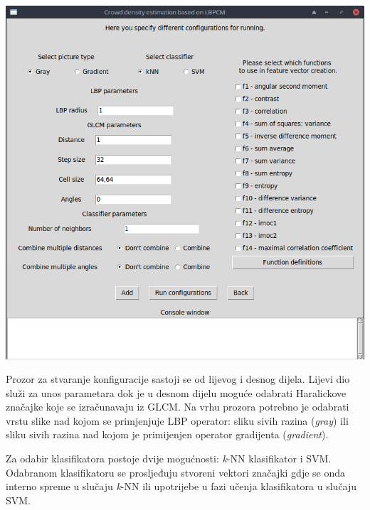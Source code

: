 \documentclass[times, utf8, zavrsni]{fer}
\begin{document}
\begin{minipage}{\linewidth}
\centering
\includegraphics[scale=0.35]{img/fvc2.png}
\end{minipage}

\bigbreak

Prozor za stvaranje konfiguracije sastoji se od lijevog i desnog dijela. 
Lijevi dio služi za unos parametara dok je u desnom dijelu moguće odabrati
Haralickove značajke koje se izračunavaju iz GLCM. Na vrhu prozora potrebno
je odabrati vrstu slike nad kojom se primjenjuje LBP operator: sliku 
sivih razina (\textit{gray}) ili sliku sivih razina nad kojom je 
primijenjen operator gradijenta (\textit{gradient}). 

\bigbreak

Za odabir klasifikatora postoje dvije mogućnosti: \textit{k}-NN klasifikator i 
SVM. Odabranom klasifikatoru se prosljeđuju stvoreni vektori značajki gdje se onda
interno spreme u slučaju \textit{k}-NN ili upotrijebe u fazi učenja klasifikatora
u slučaju SVM. 
\end{document}
